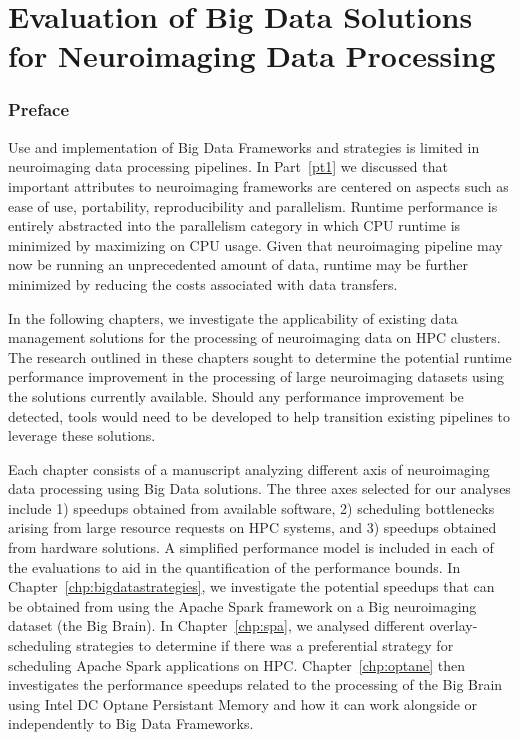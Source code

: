 \part{Evaluation of Big Data Solutions for Neuroimaging Data Processing}
\section*{Preface}
Use and implementation of Big Data Frameworks and strategies is limited in
neuroimaging data processing pipelines. In Part~\ref{pt1} we discussed
that important attributes to neuroimaging frameworks are centered on aspects
such as ease of use, portability, reproducibility and parallelism. Runtime performance
is entirely abstracted into the parallelism category in which CPU runtime is minimized
by maximizing on CPU usage. Given that neuroimaging pipeline may now be running an unprecedented
amount of data, runtime may be further minimized by reducing the costs associated with data
transfers.

In the following chapters, we investigate the applicability of existing data management
solutions for the processing of neuroimaging data on HPC clusters. The research outlined
in these chapters sought to determine the potential runtime performance
improvement in the processing of large neuroimaging datasets using the solutions currently
available. Should any performance improvement be detected, tools would need to be developed
to help transition existing pipelines to leverage these solutions.

Each chapter consists of a manuscript analyzing different axis of neuroimaging data processing
using Big Data solutions. The three axes selected for our analyses include 1) speedups obtained
from available software, 2) scheduling bottlenecks arising from large resource requests on HPC systems, and
3) speedups obtained from hardware solutions. A simplified performance model is included in 
each of the evaluations to aid in the quantification of the performance bounds.
In Chapter~\ref{chp:bigdatastrategies},
we investigate the potential speedups that can be obtained from using the Apache Spark
framework on a Big neuroimaging dataset (the Big Brain). In Chapter~\ref{chp:spa}, 
we analysed different overlay-scheduling strategies to determine if there was a 
preferential strategy for scheduling Apache Spark applications on HPC. Chapter~\ref{chp:optane}
then investigates the performance speedups related to the processing of the Big Brain using
Intel DC Optane Persistant Memory and how it can work alongside or independently to Big Data
Frameworks.  